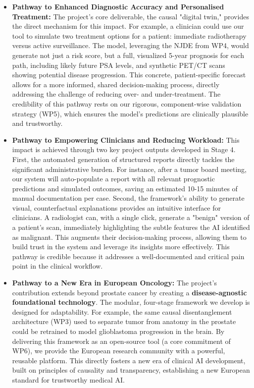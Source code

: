 \documentclass[11pt, a4paper]{article}
\begin{document}
\begin{itemize}
    \item \textbf{Pathway to Enhanced Diagnostic Accuracy and Personalised Treatment:} The project's core deliverable, the causal "digital twin," provides the direct mechanism for this impact. For example, a clinician could use our tool to simulate two treatment options for a patient: immediate radiotherapy versus active surveillance. The model, leveraging the NJDE from WP4, would generate not just a risk score, but a full, visualized 5-year prognosis for each path, including likely future PSA levels, and synthetic PET/CT scans showing potential disease progression. This concrete, patient-specific forecast allows for a more informed, shared decision-making process, directly addressing the challenge of reducing over- and under-treatment. The credibility of this pathway rests on our rigorous, component-wise validation strategy (WP5), which ensures the model's predictions are clinically plausible and trustworthy.

    \item \textbf{Pathway to Empowering Clinicians and Reducing Workload:} This impact is achieved through two key project outputs developed in Stage 4. First, the automated generation of structured reports directly tackles the significant administrative burden. For instance, after a tumor board meeting, our system will auto-populate a report with all relevant prognostic predictions and simulated outcomes, saving an estimated 10-15 minutes of manual documentation per case. Second, the framework's ability to generate visual, counterfactual explanations provides an intuitive interface for clinicians. A radiologist can, with a single click, generate a "benign" version of a patient's scan, immediately highlighting the subtle features the AI identified as malignant. This augments their decision-making process, allowing them to build trust in the system and leverage its insights more effectively. This pathway is credible because it addresses a well-documented and critical pain point in the clinical workflow.

    \item \textbf{Pathway to a New Era in European Oncology:} The project's contribution extends beyond prostate cancer by creating a \textbf{disease-agnostic foundational technology}. The modular, four-stage framework we develop is designed for adaptability. For example, the same causal disentanglement architecture (WP3) used to separate tumor from anatomy in the prostate could be retrained to model glioblastoma progression in the brain. By delivering this framework as an open-source tool (a core commitment of WP6), we provide the European research community with a powerful, reusable platform. This directly fosters a new era of clinical AI development, built on principles of causality and transparency, establishing a new European standard for trustworthy medical AI.
\end{itemize}
\end{document}
